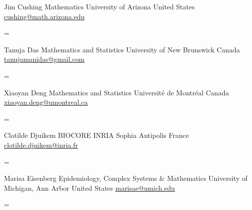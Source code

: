 \documentclass[
  letterpaper,
  DIV=11,
  numbers=noendperiod]{scrartcl}
\newenvironment{absolutelynopagebreak}
  {\par\nobreak\vfil\penalty0\vfilneg
   \vtop\bgroup}
  {\par\xdef\tpd{\the\prevdepth}\egroup
   \prevdepth=\tpd}
\begin{document}
\begin{absolutelynopagebreak}Jim   Cushing \newline
\mbox{}\quad  Mathematics \newline
\mbox{}\quad  University of Arizona \newline
\mbox{}\quad  United States \newline
\mbox{}\quad \href{mailto: cushing@math.arizona.edu }{ cushing@math.arizona.edu }
\end{absolutelynopagebreak}\vskip0.2cm
\begin{absolutelynopagebreak}Tanuja   Das \newline
\mbox{}\quad  Mathematics and Statistics \newline
\mbox{}\quad  University of New Brunswick \newline
\mbox{}\quad  Canada \newline
\mbox{}\quad \href{mailto: tanujamanidas@gmail.com }{ tanujamanidas@gmail.com }
\end{absolutelynopagebreak}\vskip0.2cm
\begin{absolutelynopagebreak}Xiaoyan   Deng \newline
\mbox{}\quad  Mathematics and Statistics \newline
\mbox{}\quad  Université de Montréal \newline
\mbox{}\quad  Canada \newline
\mbox{}\quad \href{mailto: xiaoyan.deng@umontreal.ca }{ xiaoyan.deng@umontreal.ca }
\end{absolutelynopagebreak}\vskip0.2cm
\begin{absolutelynopagebreak}Clotilde   Djuikem \newline
\mbox{}\quad  BIOCORE \newline
\mbox{}\quad  INRIA Sophia Antipolis \newline
\mbox{}\quad  France \newline
\mbox{}\quad \href{mailto: clotilde.djuikem@inria.fr }{ clotilde.djuikem@inria.fr }
\end{absolutelynopagebreak}\vskip0.2cm
\begin{absolutelynopagebreak}Marisa   Eisenberg \newline
\mbox{}\quad  Epidemiology, Complex Systems \& Mathematics \newline
\mbox{}\quad  University of Michigan, Ann Arbor \newline
\mbox{}\quad  United States \newline
\mbox{}\quad \href{mailto: marisae@umich.edu }{ marisae@umich.edu }
\end{absolutelynopagebreak}\vskip0.2cm
\end{document}
